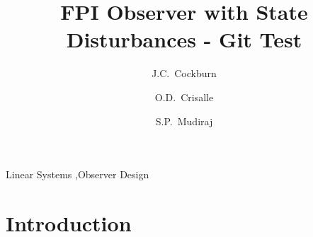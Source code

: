 \documentclass[preprint,review,11pt]{elsarticle}
\begin{document}
\begin{frontmatter}


\title{FPI Observer with State Disturbances - Git Test}

\author[rit]{J.C.~Cockburn}

\author[uf]{O.D.~Crisalle}

\author[uf]{S.P.~Mudiraj}


\address[rit]{Computer Engineering Department, %
 Rochester Institute of Technology, Rochester NY, USA 14623}
\address[uf]{Chemical Engineering Department, %
University of Florida, Gainesville FL, USA 32611}

\begin{abstract}
\blindtext[1]
\begin{comment}
Suspendisse potenti. Suspendisse quis sem elit, et mattis nisl. Phasellus consequat erat eu velit rhoncus non pharetra neque auctor. Phasellus eu lacus quam. Ut ipsum dolor, euismod aliquam congue sed, lobortis et orci. Mauris eget velit id arcu ultricies auctor in eget dolor. Pellentesque suscipit adipiscing sem, imperdiet laoreet dolor elementum ut. Mauris condimentum est sed velit lacinia placerat. Vestibulum ante ipsum primis in faucibus orci luctus et ultrices posuere cubilia Curae; Nullam diam metus, pharetra vitae euismod sed, placerat ultrices eros. Aliquam tincidunt dapibus venenatis. In interdum tellus nec justo accumsan aliquam. Nulla sit amet massa augue.
\end{comment}
\end{abstract}


\begin{keyword}
Linear Systems \sep Observer Design 


\end{keyword}

\end{frontmatter}

\linenumbers

\section{Introduction}
\end{document}

